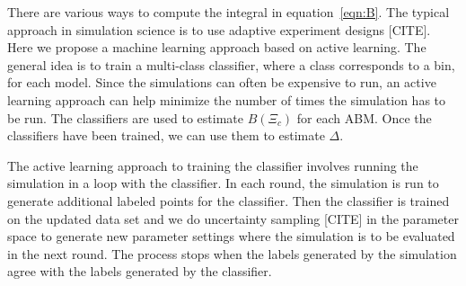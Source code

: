 There are various ways to compute the integral in equation~\ref{eqn:B}. The typical approach in simulation
science is to use adaptive experiment designs [CITE]. Here we propose a machine learning approach based on active learning. The general idea is to train a multi-class classifier, where a class corresponds to a bin, for each model. Since the simulations can often be expensive to run, an active learning approach can help minimize the number of times the simulation has to be run.
The classifiers are used to estimate $B(\Xi_{c})$ for each ABM.
Once the classifiers have been trained, we can use them to estimate $\Delta$.

The active learning approach to training the classifier involves running the simulation in a loop with the classifier. In each round, the simulation is run to generate additional labeled points for the classifier. Then the classifier is trained on the updated data set and we do uncertainty sampling [CITE] in the parameter space to generate new parameter settings where the simulation is to be evaluated in the next round. The process stops when the labels generated by the simulation agree with the labels generated by the classifier.
